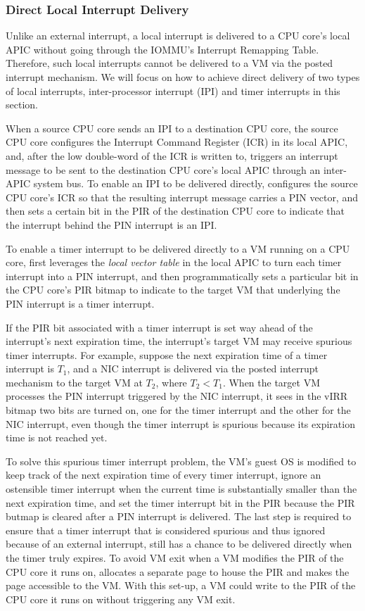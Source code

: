 \subsubsection{Direct Local Interrupt Delivery} \label{subsubsec:shared_pid_dtid}

Unlike an external interrupt, a local interrupt is delivered to a CPU core's local APIC without going through the IOMMU's Interrupt Remapping Table.
Therefore, such local interrupts cannot be delivered to a VM via the posted interrupt mechanism.
We will focus on how to achieve direct delivery of two types of local interrupts, inter-processor interrupt (IPI) and timer interrupts in this section. 

When a source CPU core sends an IPI to a destination CPU core, the source CPU core configures the Interrupt Command Register (ICR) in its local APIC, 
and, after the low double-word of the ICR is written to, triggers an interrupt message to be sent to the destination CPU core's local APIC through an inter-APIC system bus.
To enable an IPI to be delivered directly, \na configures the source CPU core's ICR so that the resulting interrupt message carries a PIN vector,
and then sets a certain bit in the PIR of the destination CPU core to indicate that the interrupt behind the PIN interrupt is an IPI.
 

To enable a timer interrupt to be delivered directly to a VM running on a CPU core,
\na first leverages the {\em local vector table} in the local APIC to turn each timer interrupt into a PIN interrupt, and 
then programmatically sets a particular bit in the CPU core's PIR bitmap to indicate to the target VM that underlying the PIN interrupt is a timer interrupt.

If the PIR bit associated with a timer interrupt is set way ahead of the interrupt's next expiration time, 
the interrupt's target VM may receive spurious timer interrupts. 
For example, suppose the next expiration time of a timer interrupt is $T_1$, and a NIC interrupt is delivered via the posted interrupt mechanism to the target VM at $T_2$, where ${T_2} < {T_1}$.
When the target  VM processes the PIN interrupt triggered by the NIC interrupt, it sees in the vIRR bitmap two bits are turned on, one for the timer interrupt and the other for the NIC
interrupt, even though the timer interrupt is spurious because its expiration time is not reached yet.

To solve this spurious timer interrupt problem, the VM's guest OS is modified to keep track of the next expiration time of every timer interrupt, ignore an ostensible timer interrupt when  
the current time is substantially smaller than the next expiration time, and set the timer interrupt bit in the PIR because the PIR butmap is cleared after a PIN interrupt is delivered.
The last step is required to ensure that a timer interrupt that is considered spurious and thus ignored because of an external interrupt,  still has a chance to be delivered directly when the timer truly expires.  
To avoid VM exit when a VM modifies the PIR of the CPU core it runs on, \na allocates a separate page to house the PIR and makes the page accessible to the VM.
With this set-up, a VM could write to the PIR of the CPU core it runs on without triggering any VM exit.

